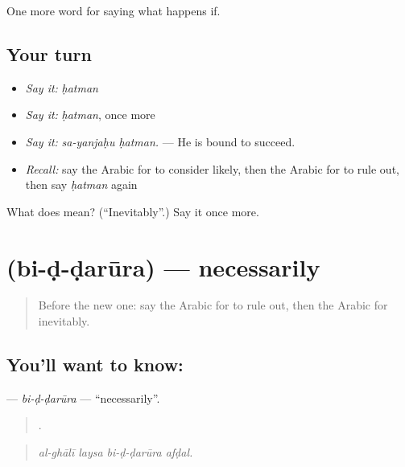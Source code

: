 \begin{grammarlens}[title={What you've built}]
One more word for saying what happens if.
\end{grammarlens}

\subsection*{Your turn}
\begin{itemize}
\raggedright
  \item \emph{Say it:} \emph{ḥatman}
  \item \emph{Say it:} \emph{ḥatman}, once more
  \item \emph{Say it:} \emph{sa-yanjaḥu ḥatman.} — He is bound to succeed.
  \item \emph{Recall:} say the Arabic for to consider likely, then the Arabic for to rule out, then say \emph{ḥatman} again
\end{itemize}

\begin{tcolorbox}[breakable,colback=teal!4,colframe=teal!35!black,title={Before you move on}]
What does  mean? (\textquotedblleft{}Inevitably\textquotedblright{}.) Say it once more.
\end{tcolorbox}
\section[\texorpdfstring{\ar{بالضرورة} (bi-ḍ-ḍarūra)}{بالضرورة (bi-ḍ-ḍarūra)}]{ (bi-ḍ-ḍarūra) — necessarily}

\label{lesson:AR-C402-bi-d-darura}



\begin{quote}
Before the new one: say the Arabic for to rule out, then the Arabic for inevitably.
\end{quote}

\subsection*{You'll want to know: }
\textbf{} — \emph{bi-ḍ-ḍarūra} — \textquotedblleft{}necessarily\textquotedblright{}.

\begin{quote}
   .
\end{quote}

\begin{quote}
\emph{al-ghālī laysa bi-ḍ-ḍarūra afḍal.}
\end{quote}

